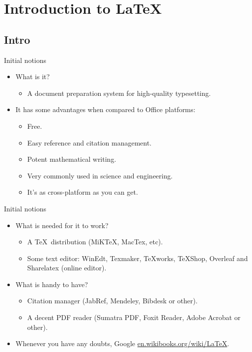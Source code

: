 \documentclass[usenames,dvipsnames,aspectratio=169]{beamer}
\newcommand{\aitem}{\item[$\cdot$]}
\newcommand{\bitem}{\item[-]}
\begin{document}
\section{Introduction to \LaTeX}
\subsection{Intro}
\begin{frame}[t]{Initial notions}
\begin{itemize}
\aitem What is it?
\begin{itemize}
\bitem A document preparation system for high-quality typesetting.
\end{itemize}
\aitem It has some advantages when compared to Office platforms:
\begin{itemize}
\bitem Free.
\bitem Easy reference and citation management.
\bitem Potent mathematical writing.
\bitem Very commonly used in science and engineering.
\bitem It's as cross-platform as you can get.
\end{itemize}
\end{itemize}
\end{frame}


\begin{frame}[t]{Initial notions}
\begin{itemize}
\aitem What is needed for it to work?
\begin{itemize}
\bitem A \TeX~distribution (MiKTeX, MacTex, etc).
\bitem Some text editor: WinEdt, Texmaker, TeXworks, TeXShop, Overleaf and Sharelatex (online editor).
\end{itemize}
\aitem What is handy to have?
\begin{itemize}
\bitem Citation manager (JabRef, Mendeley, Bibdesk or other).
\bitem A decent PDF reader (Sumatra PDF, Foxit Reader, Adobe Acrobat or other).
\end{itemize}
\aitem Whenever you have any doubts, Google \textcolor{blue}{\url{en.wikibooks.org/wiki/LaTeX}}.
\end{itemize}
\end{frame}

\end{document}
